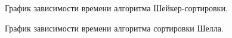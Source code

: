 \documentclass[a4paper]{article}
\begin{document}
\begin{figure}[h]
	\caption{График зависимости времени алгоритма Шейкер-сортировки. \centering}
	\label{image6}
\end{figure}

\begin{figure}[h]
	\caption{График зависимости времени алгоритма сортировки Шелла. \centering}
	\label{image7}
\end{figure}
\clearpage
\end{document}
